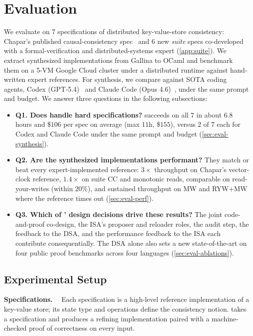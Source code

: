 \section{Evaluation}
\label{sec:eval}

We evaluate \sys{} on 7 \coq{} specifications of distributed key-value-store consistency: Chapar's published causal-consistency spec~\cite{chapar} and 6 new \emph{\sys{} suite} specs co-developed with a formal-verification and distributed-systems expert (\cref{app:suite}). We extract synthesized implementations from Gallina to OCaml and benchmark them on a 5-VM Google Cloud cluster under a distributed runtime against hand-written expert references. For synthesis, we compare against SOTA coding agents, Codex (GPT-5.4)~\cite{codex} and Claude Code (Opus 4.6)~\cite{claude-code}, under the same prompt and budget. We answer three questions in the following subsections:
\begin{itemize}[leftmargin=*,nosep,itemsep=2pt,topsep=2pt]
\item \textbf{Q1. Does \sys{} handle hard specifications?} \sys{} succeeds on all $7$ in about $6.8$ hours and \$$106$ per spec on average (max $11$h, \$$155$), versus $2$ of $7$ each for Codex and Claude Code under the same prompt and budget (\cref{sec:eval-synthesis}).
\item \textbf{Q2. Are the synthesized implementations performant?} They match or beat every expert-implemented reference: $3\times$ throughput on Chapar's vector-clock reference, $1.4\times$ on \sys{} suite CC and monotonic reads, comparable on read-your-writes (within $20\%$), and sustained throughput on MW and RYW+MW where the reference times out (\cref{sec:eval-perf}).
\item \textbf{Q3. Which of \sys{}' design decisions drive these results?} The joint code-and-proof co-design, the ISA's proposer and reloader roles, the audit step, the \coq{} feedback to the DSA, and the performance feedback to the ISA each contribute consequentially. The DSA alone also sets a new state-of-the-art on four public proof benchmarks across four languages (\cref{sec:eval-ablations}).
\end{itemize}

\subsection{Experimental Setup}
\label{sec:eval-setup}

\textbf{Specifications. \ }
Each specification is a high-level reference implementation of a key-value store; its state type and operations define the consistency notion. \sys{} takes a specification and produces a refining implementation paired with a machine-checked proof of correctness on every input.

